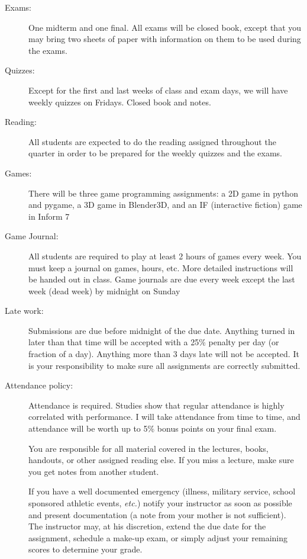 \documentclass{article}
\begin{document}
\begin{description}
\item [Exams:] One midterm and one final.  All exams will be
  closed book, except that you may bring two sheets of paper with
  information on them to be used during the exams.

\item [Quizzes:] Except for the first and last weeks of class and
  exam days, we  will have weekly quizzes on Fridays.  Closed book and
  notes. 

\item [Reading:] All students are expected to do the 
  reading assigned throughout the quarter in order to be prepared for
  the weekly quizzes and the exams.

\item [Games:] There will be three game programming
  assignments:  a 2D game in python and pygame, a 3D game in Blender3D,
  and an IF (interactive fiction) game in Inform 7

\item [Game Journal:] All students are required to play at least 2
  hours of games every week.  You must keep a journal on games, hours,
  etc.  More detailed instructions will be handed out in class. Game
  journals are due every week except the last week (dead week) by
  midnight on Sunday

\item[Late work:] Submissions are due before midnight of the due
date. Anything turned in later than that time will be accepted with a
25\% penalty per day (or fraction of a day).  Anything more than 3
days late will not be accepted.  It is your responsibility to
make sure all assignments are correctly submitted.

\item[Attendance policy:]  Attendance is required.
  Studies show that regular attendance is highly correlated with
  performance.  I will take attendance from time to time,
  and attendance will be worth up to 5\% bonus points on your final
  exam.  

  You are responsible for all material covered in the lectures,
  books, handouts, or other assigned reading
  else.  If you miss a lecture, make sure you get notes from another
  student.  

  If you have a well documented emergency (illness, military service,
  school sponsored athletic events, {\em etc.}) notify your instructor
  as soon as possible and present documentation (a note from your
  mother is not sufficient).  The instructor may, at his discretion,
  extend the due date for the assignment, schedule a make-up exam,
  or simply adjust your remaining scores to determine your grade.



\end{description}
\end{document}
